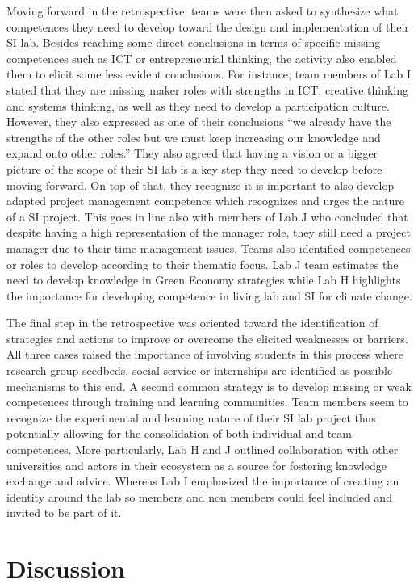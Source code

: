\documentclass[AMA,STIX1COL,APA,STIX2COL]{WileyNJD-v2}
\begin{document}
Moving forward in the retrospective, teams were then asked to synthesize
what competences they need to develop toward the design and
implementation of their SI lab. Besides reaching some direct conclusions
in terms of specific missing competences such as ICT or entrepreneurial
thinking, the activity also enabled them to elicit some less evident
conclusions. For instance, team members of Lab I stated that they are
missing maker roles with strengths in ICT, creative thinking and systems
thinking, as well as they need to develop a participation culture.
However, they also expressed as one of their conclusions ``we already
have the strengths of the other roles but we must keep increasing our
knowledge and expand onto other roles.'' They also agreed that having a
vision or a bigger picture of the scope of their SI lab is a key step
they need to develop before moving forward. On top of that, they
recognize it is important to also develop adapted project management
competence which recognizes and urges the nature of a SI project. This
goes in line also with members of Lab J who concluded that despite
having a high representation of the manager role, they still need a
project manager due to their time management issues. Teams also
identified competences or roles to develop according to their thematic
focus. Lab J team estimates the need to develop knowledge in Green
Economy strategies while Lab H highlights the importance for developing
competence in living lab and SI for climate change.

The final step in the retrospective was oriented toward the
identification of strategies and actions to improve or overcome the
elicited weaknesses or barriers. All three cases raised the importance
of involving students in this process where research group seedbeds,
social service or internships are identified as possible mechanisms to
this end. A second common strategy is to develop missing or weak
competences through training and learning communities. Team members seem
to recognize the experimental and learning nature of their SI lab
project thus potentially allowing for the consolidation of both
individual and team competences. More particularly, Lab H and J outlined
collaboration with other universities and actors in their ecosystem as a
source for fostering knowledge exchange and advice. Whereas Lab I
emphasized the importance of creating an identity around the lab so
members and non members could feel included and invited to be part of
it.

\hypertarget{discussion}{%
\section{Discussion}\label{discussion}}
\end{document}
